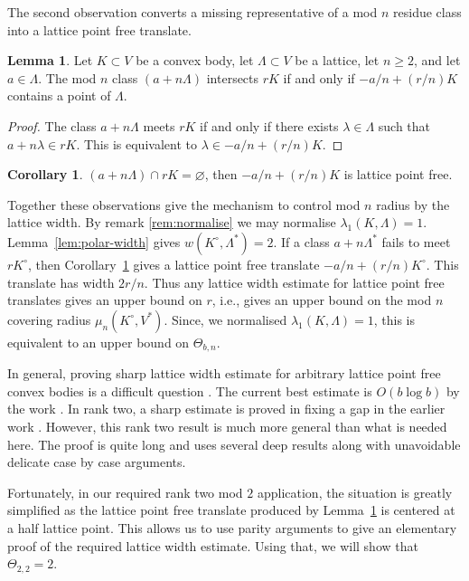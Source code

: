 \documentclass[11pt,reqno]{amsart}
\numberwithin{equation}{section}
\numberwithin{equation}{section}
\theoremstyle{definition}
\newtheorem{lemma}[theorem]{Lemma}
\newtheorem{corollary}[theorem]{Corollary}
\begin{document}
The second observation converts a missing representative of a mod $n$ residue class into a lattice point free translate.

\begin{lemma}\label{lem:residue-translate}
Let \(K\subset V\) be a convex body, let \(\Lambda\subset V\) be a lattice, let \(n\ge2\), and let \(a\in\Lambda\). The mod $n$ class \((a+n\Lambda)\) intersects \( rK\) if and only if \(-a/n+(r/n)K\) contains a point of \(\Lambda\). 
\end{lemma}
\begin{proof}
The class \(a+n\Lambda\) meets \(rK\) if and only if there exists \(\lambda\in\Lambda\) such that \(a+n\lambda\in rK\). This is equivalent to \(\lambda\in -a/n+(r/n)K\). 
\end{proof}
\begin{corollary} \label{cor:free}
\((a+n\Lambda)\cap rK=\varnothing\), then \(-a/n+(r/n)K\) is lattice point free.
\end{corollary}

Together these observations give the mechanism to control mod $n$ radius by the lattice width. By remark \ref{rem:normalise} we may normalise \(\lambda_1(K,\Lambda)=1\). Lemma~\ref{lem:polar-width} gives \(w(K^\circ,\Lambda^\ast)=2\). If a class \(a+n\Lambda^\ast\) fails to meet \(rK^\circ\), then Corollary~\ref{cor:free} gives a lattice point free translate \(-a/n+(r/n)K^\circ\). This translate has width \(2r/n\). Thus any lattice width estimate for lattice point free translates gives an upper bound on \(r\), i.e., gives an upper bound on the mod $n$ covering radius $\mu_n(K^\circ,V^*)$. Since, we normalised $\lambda_1(K,\Lambda)=1$, this is equivalent to an upper bound on $\Theta_{b,n}$.

In general, proving sharp lattice width estimate for arbitrary lattice point free convex bodies is a difficult question \cite{KL88}. The current best estimate is $O(b\log b)$ by the work \cite{Banaszczyk2}. In rank two, a sharp estimate is proved in \cite{aw12} fixing a gap in the earlier work \cite{KL88}. However, this rank two result is much more general than what is needed here. The proof is quite long and uses several deep results along with unavoidable delicate case by case arguments. 

Fortunately, in our required rank two mod \(2\) application, the situation is greatly simplified as the lattice point free translate produced by Lemma~\ref{lem:residue-translate} is centered at a half lattice point. This allows us to use parity arguments to give an elementary proof of the required lattice width estimate. Using that, we will show that \(\Theta_{2,2}=2\).
\end{document}
